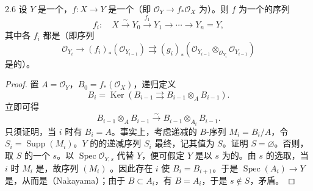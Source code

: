 \begin{SGAresult}{}{2.6}
设 $Y$ 是一个，$f:X\to Y$ 是一个（即 $\mathcal O_Y\to f_*\mathcal O_X$ 为）。则 $f$ 为一个的序列
\[
f_i:\quad X\xrightarrow\sim Y_0\xrightarrow{f_1}Y_1\longrightarrow\cdots\longrightarrow Y_n=Y,
\]
其中各 $f_i$ 都是（即序列
\[
\mathcal O_{Y_i}\longrightarrow(f_i)_*(\mathcal O_{Y_{i-1}})
\rightrightarrows(g_i)_*(\mathcal O_{Y_{i-1}}\otimes_{\mathcal O_{Y_i}}\mathcal O_{Y_{i-1}})
\]
是的）。
\end{SGAresult}
\begin{proof}
置 $A=\mathcal O_Y$，$B_0=f_*(\mathcal O_X)$，递归定义
\[
B_i=\operatorname{Ker}\left(B_{i-1}\rightrightarrows B_{i-1}\otimes_A B_{i-1}\right).
\]
立即可得
\[
B_{i-1}\otimes_A B_{i-1}\xrightarrow\sim B_{i-1}\otimes_{A_i}B_{i-1}.
\]
只须证明，当 $i$ 时有 $B_i=A$。事实上，考虑递减的 $B$-序列 $M_i=B_i/A$，令 $S_i=\operatorname{Supp}(M_i)$。$Y$ 的的递减序列 $S_i$ 最终，记其值为 $S$。证明 $S=\varnothing$。否则，取 $S$ 的一个 $s$。以 $\operatorname{Spec}\mathcal O_{Y,s}$ 代替 $Y$，便可假定 $Y$ 是以 $s$ 为的。由 $s$ 的选取，当 $i$ 时 $M_i$ 是，故序列 $(M_i)$ 。因此存在 $i$ 使 $B_i=B_{i+1}$。于是 $\operatorname{Spec}(A_i)\to Y$ 是，从而是（Nakayama）；由于 $B\subset A_i$，有 $B=A_i$，于是 $s\notin S$，矛盾。
\end{proof}

